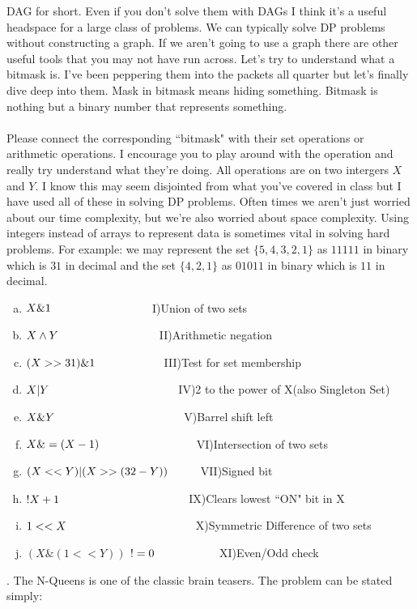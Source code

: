 \documentclass[12pt]{article}
\newcommand\tab[1][1cm]{\hspace*{#1}}
\begin{document}
DAG for short. Even if you don't solve them with DAGs I think it's a useful headspace for a large class of problems. 
We can typically solve DP problems without constructing a graph. If we aren't going to use a graph there are other useful
tools that you may not have run across. Let's try to understand what a bitmask is. I've been peppering
them into the packets all quarter but let's finally dive deep into them. Mask in bitmask means hiding 
something. Bitmask is nothing but a binary number that represents something.\\\\
Please connect the corresponding ``bitmask" with their
set operations or arithmetic operations. I encourage you to 
play around with the operation and really try understand what
they're doing. All operations are on two intergers $X$ and $Y$. 
I know this may seem disjointed from what you've covered in
class but I have used all of these in solving DP problems. 
Often times we aren't just worried about our time complexity,
but we're also worried about space complexity. Using integers
instead of arrays to represent data is sometimes vital in solving
hard problems. For example: we may represent the set $\{5,4,3,2,1\}$ 
as $11111$ in binary which is $31$ in decimal and the set $\{4,2,1\}$ 
as $01011$ in binary which is $11$ in decimal.
\begin{enumerate}[a)]
    \item  $X \& 1 \tab\tab\tab$ I)Union of two sets
    \item  $X \wedge Y \tab\tab\tab$ II)Arithmetic negation
    \item  $ (X >> 31) \& 1 \tab\tab$ III)Test for set membership
    \item  $X | Y \tab\tab\tab\tab$IV)2 to the power of X(also Singleton Set)
    \item  $X \& Y \tab\tab\tab\tab$V)Barrel shift left
    \item  $X \&= (X - 1) \tab\tab\tab$VI)Intersection of two sets
    \item  $(X<<Y) | (X >> (32 - Y))\tab$VII)Signed bit
    \item  $ ! X + 1 \tab\tab\tab\tab$IX)Clears lowest ``ON" bit in X
    \item  $1 << X \tab\tab\tab\tab$X)Symmetric Difference of two sets
    \item  $(X \& (1 << Y))$ $!= 0 \tab\tab$XI)Even/Odd check 
    \end{enumerate}
\newpage
{}. The N-Queens is one of the classic brain teasers. The problem can be stated simply:
\end{document}
